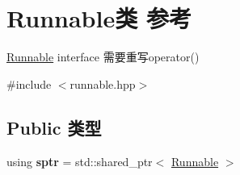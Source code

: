 \hypertarget{classRunnable}{}\section{Runnable类 参考}
\label{classRunnable}


\hyperlink{classRunnable}{Runnable} interface 需要重写operator()  




{\ttfamily \#include $<$runnable.\+hpp$>$}

\subsection*{Public 类型}
\begin{DoxyCompactItemize}
\item 
\mbox{\label{classRunnable_abe8d3066c7305401d6f0aad8e70780f2}} 
using {\bfseries sptr} = std\+::shared\+\_\+ptr$<$ \hyperlink{classRunnable}{Runnable} $>$
\end{DoxyCompactItemize}
